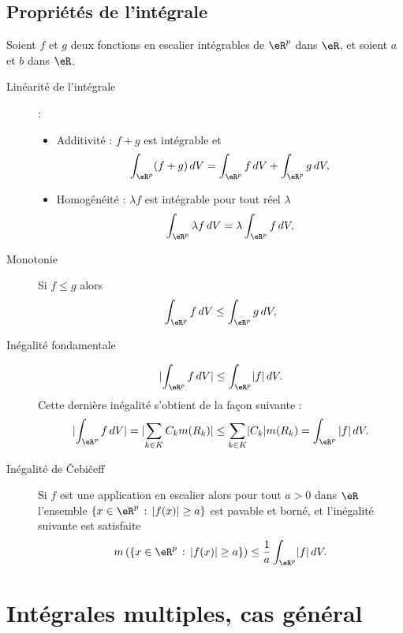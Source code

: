 \subsection{Propriétés de l'intégrale}
Soient $f$ et $g$ deux fonctions en escalier intégrables de $\eR^p$ dans $\eR$, et soient $a$ et $b$ dans $\eR$. 
\begin{description}
\item[Linéarité de l'intégrale] : 
  \begin{itemize}
  \item Additivité : $f+g$ est intégrable et 
\[
\int_{\eR^p} (f+g)\, dV = \int_{\eR^p} f\, dV+ \int_{\eR^p} g\, dV,
\]
\item Homogénéité : $\lambda f$ est intégrable pour tout réel $\lambda$ 
\[
\int_{\eR^p} \lambda  f\, dV = \lambda\int_{\eR^p} f\, dV,
\]
  \end{itemize}
\item[Monotonie] Si $f\leq g$ alors 
\[
 \int_{\eR^p} f\, dV\leq \int_{\eR^p} g\, dV,
\]
\item[Inégalité fondamentale]
  \[
\lvert \int_{\eR^p}f\,dV\rvert \leq\int_{\eR^p}\lvert f\rvert\,dV.
\] 
Cette dernière inégalité s'obtient de la façon suivante :
\[
\lvert\int_{\eR^p}f\,dV\rvert =\lvert \sum_{k\in K} C_k m(R_k)\rvert \leq\sum_{k\in K}\lvert C_k\rvert m(R_k)=\int_{\eR^p}|f|\,dV.
\] 
\item[Inégalité de Čebičeff]  Si $f$ est une application en escalier alors pour tout $a>0$ dans $\eR$ l'ensemble $\{x\in\eR^p\,:\, |f(x)|\geq a\}$ est pavable et borné, et l'inégalité suivante est satisfaite
\[
m\left(\{x\in\eR^p\,:\, |f(x)|\geq a\}\right)\leq \frac{1}{a} \int_{\eR^p}\lvert f\rvert\,dV.
\]
\end{description}

\section{Intégrales multiples, cas général}

